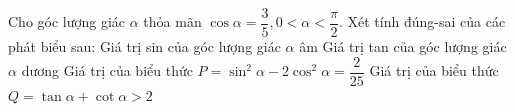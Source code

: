 \begin{ex}%
 Cho góc  lượng giác $\alpha$ thỏa mãn $\cos\alpha=\dfrac{3}{5},0<\alpha<\dfrac{\pi}{2}$. Xét tính đúng-sai của các phát biểu sau:
 \choiceTF 
  {Giá trị sin của góc lượng giác $\alpha$  âm}
  {\True  Giá trị tan của góc lượng giác $\alpha$ dương}
  {Giá  trị của biểu thức $P=\sin^2\alpha-2\cos^2\alpha=\dfrac{2}{25}$}
  {\True  Giá trị của biểu thức $Q=\tan\alpha+\cot\alpha>2$}
\end{ex}

